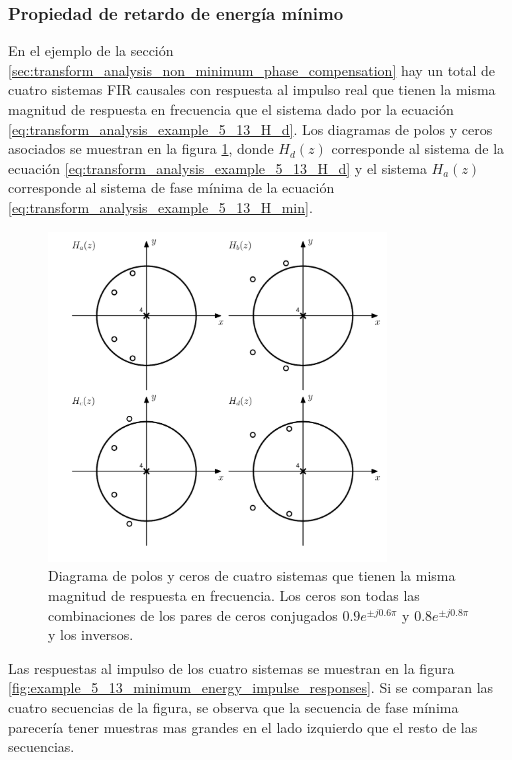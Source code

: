 \documentclass[a4paper]{report}
\begin{document}
\subsubsection{Propiedad de retardo de energía mínimo} 

En el ejemplo de la sección \ref{sec:transform_analysis_non_minimum_phase_compensation} hay un total de cuatro sistemas FIR causales con respuesta al impulso real que tienen la misma magnitud de respuesta en frecuencia que el sistema dado por la ecuación \ref{eq:transform_analysis_example_5_13_H_d}. Los diagramas de polos y ceros asociados se muestran en la figura \ref{fig:example_5_13_minimum_energy_zero_pole_plot}, donde \(H_d(z)\) corresponde al sistema de la ecuación \ref{eq:transform_analysis_example_5_13_H_d} y el sistema \(H_a(z)\) corresponde al sistema de fase mínima de la ecuación \ref{eq:transform_analysis_example_5_13_H_min}. 
\begin{figure}[!htb]
 \begin{center}
 \includegraphics[width=0.8\textwidth]{figuras/example_5_13_minimum_energy_zero_pole_plot.pdf}
 \caption{\label{fig:example_5_13_minimum_energy_zero_pole_plot} Diagrama de polos y ceros de cuatro sistemas que tienen la misma magnitud de respuesta en frecuencia. Los ceros son todas las combinaciones de los pares de ceros conjugados \(0.9e^{\pm j0.6\pi}\) y \(0.8e^{\pm j0.8\pi}\) y los inversos.}
 \end{center}
\end{figure}
Las respuestas al impulso de los cuatro sistemas se muestran en la figura \ref{fig:example_5_13_minimum_energy_impulse_responses}. Si se comparan las cuatro secuencias de la figura, se observa que la secuencia de fase mínima parecería tener muestras mas grandes en el lado izquierdo que el resto de las secuencias.
\end{document}
